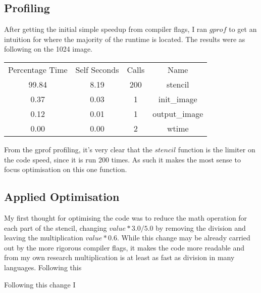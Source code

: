 \documentclass{article}
\begin{document}
    \subsection{Profiling}
    After getting the initial simple speedup from compiler flags, I ran $gprof$ to get an intuition for where the majority of the runtime is located.
    The results were as following on the 1024 image.
    \begin{center}
    \begin{tabular}{ c c c c }
    Percentage Time & Self Seconds & Calls & Name \\
    99.84 & 8.19 & 200 & stencil \\
    0.37 & 0.03 & 1 & init_image \\
    0.12 & 0.01 & 1 & output_image \\
    0.00 & 0.00 & 2 & wtime
    \end{tabular}
    \end{center}
    From the gprof profiling, it's very clear that the $stencil$ function is the limiter on the code speed, since it is run 200 times. As such
    it makes the most sense to focus optimisation on this one function.
    \subsection{Applied Optimisation}
    My first thought for optimising the code was to reduce the math operation for each part of the stencil, changing $value * 3.0/5.0$ by removing the
    division and leaving the multiplication $value * 0.6$. While this change may be already carried out by the more rigorous compiler flags, it makes
    the code more readable and from my own research multiplication is at least as fast as division in many languages.
    Following this 
    
    Following this change I 
    
\end{document}
